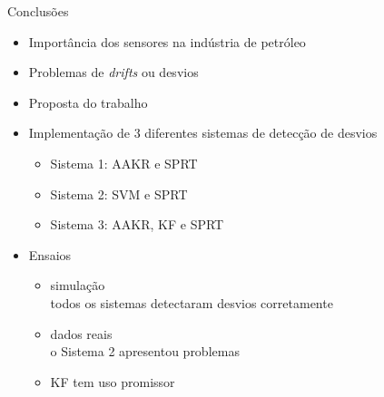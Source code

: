 \documentclass{beamer}
\begin{document}
\begin{frame}{Conclusões}

    \begin{itemize}
        \item Importância dos sensores na indústria de petróleo
        \item Problemas de \textit{drifts} ou desvios
        \item Proposta do trabalho
        \item Implementação de 3 diferentes sistemas de detecção de desvios
            \begin{itemize}
                \item Sistema 1: AAKR e SPRT
                \item Sistema 2: SVM e SPRT
                \item Sistema 3: AAKR, KF e SPRT
            \end{itemize}
        \item Ensaios
            \begin{itemize}
                \item simulação\\
                    todos os sistemas detectaram desvios corretamente
                \item dados reais\\
                    o Sistema 2 apresentou problemas
                \item KF tem uso promissor
            \end{itemize}
    \end{itemize}

    
\end{frame}
\end{document}

